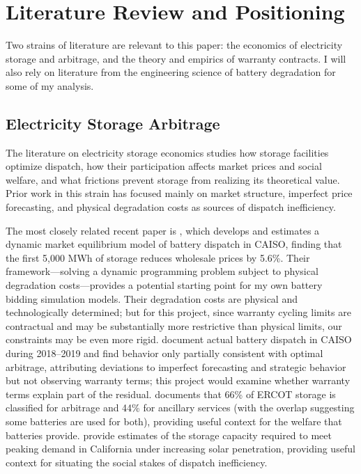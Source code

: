 \documentclass[12pt]{article}
\begin{document}
\section{Literature Review and Positioning}

Two strains of literature are relevant to this paper: the economics of electricity storage and arbitrage, and the theory and empirics of warranty contracts. I will also rely on literature from the engineering science of battery degradation for some of my analysis.

\subsection{Electricity Storage Arbitrage}

The literature on electricity storage economics studies how storage facilities optimize dispatch, how their participation affects market prices and social welfare, and what frictions prevent storage from realizing its theoretical value. Prior work in this strain has focused mainly on market structure, imperfect price forecasting, and physical degradation costs as sources of dispatch inefficiency.

The most closely related recent paper is \citet{butters2025}, which develops and estimates a dynamic market equilibrium model of battery dispatch in CAISO, finding that the first 5,000 MWh of storage reduces wholesale prices by 5.6\%. Their framework---solving a dynamic programming problem subject to physical degradation costs---provides a potential starting point for my own battery bidding simulation models. Their degradation costs are physical and technologically determined; but for this project, since warranty cycling limits are contractual and may be substantially more restrictive than physical limits, our constraints may be even more rigid. \citet{lamp2022} document actual battery dispatch in CAISO during 2018--2019 and find behavior only partially consistent with optimal arbitrage, attributing deviations to imperfect forecasting and strategic behavior but not observing warranty terms; this project would examine whether warranty terms explain part of the residual. \citet{reynolds2025} documents that 66\% of ERCOT storage is classified for arbitrage and 44\% for ancillary services (with the overlap suggesting some batteries are used for both), providing useful context for the welfare that batteries provide. \citet{denholm2018} provide estimates of the storage capacity required to meet peaking demand in California under increasing solar penetration, providing useful context for situating the social stakes of dispatch inefficiency.
\end{document}
